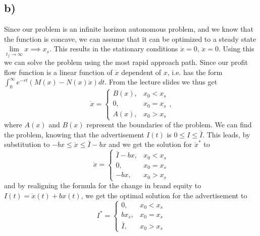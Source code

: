 \documentclass{article}
\begin{document}
\subsection*{b)}
Since our problem is an infinite horizon autonomous problem, and we know that the function is concave, we can assume that it can be optimized to a steady state $\lim\limits_{t_f \rightarrow\infty}x\implies x_s$. This results in the stationary conditions $\dot{x} = 0$, $\ddot{x} = 0$. Using this we can solve the problem using the most rapid approach path. Since our profit flow function is a linear function of $\dot{x}$ dependent of $x$, i.e. has the form $\int_{0}^{\infty}e^{-rt}\left(M(x) - N(x)\dot{x}\right)dt$. From the lecture slides we thus get
\begin{equation}
	\dot{x} =
	\begin{cases}
		B(x),& x_0 < x_s\\
		0,& x_0 = x_s\\
		A(x), &x_0 > x_s
	\end{cases},
\end{equation}
 where $A(x)$ and $B(x)$ represent the boundaries of the problem. We can find the problem, knowing that the advertisement $I(t)$ is $0 \leq I \leq \bar{I}$. This leads, by substitution to $-bx \leq \dot{x} \leq \bar{I} -bx$ and we get the solution for $\dot{x}^*$ to
\begin{equation}
	\dot{x} =
	\begin{cases}
		\bar{I} -bx,& x_0 < x_s\\
		0,& x_0 = x_s\\
		-bx, &x_0 > x_s
	\end{cases}
\end{equation}
and by realigning the formula for the change in brand equity to $I(t) = \dot{x}(t) + bx(t)$, we get the optimal solution for the advertisement to
\begin{equation}
	I^* =
	\begin{cases}
		0,& x_0 < x_s\\
		bx_s,& x_0 = x_s\\
		\bar{I}, &x_0 > x_s
	\end{cases}
\end{equation}
\end{document}
